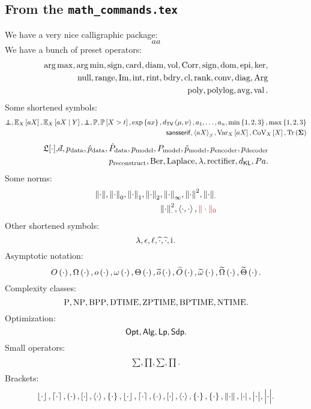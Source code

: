 \subsection{From the \texttt{math\_commands.tex}}
We have a very nice calligraphic package:
\begin{equation}
    aa
\end{equation}
We have a bunch of preset operators:
\begin{align}
    \operatorname*{arg\,max}, \operatorname*{arg\,min}, \operatorname{sign}, \operatorname{card}, \operatorname{diam}, \operatorname{vol}, \operatorname{Corr}, \operatorname{sign}, \operatorname{dom}, \operatorname{epi}, \operatorname{ker},
    \\
    \operatorname{null}, \operatorname{range}, \operatorname{Im}, \operatorname{int}, \operatorname{rint}, \operatorname{bdry}, \operatorname{cl}, \operatorname{rank}, \operatorname{conv}, \operatorname{diag}, \operatorname{Arg}
    \\
    \operatorname{\mathrm{poly}}, \operatorname{\mathrm{polylog}}, \operatorname{\mathop{\mathrm{avg}}}, \operatorname{{\mathrm{val}}}. 
\end{align}
Some shortened symbols:
 \begin{align}
     \independent, \Exp{X}{aX},\ExpCond{X}{aX}{Y}, \indep, \Prob, \Proba{X> t}, \expon{ax}, \dTV{\mu}{\nu}, \abc{a}{n}, \minim{1, 2, 3}, \maxim{1, 2, 3}
     \\
     \msf{sans serif}, \boltz{aX}{\beta}, \Var{X}{aX}, \CoV{X}{X}, \Tr{\mSigma}
 \end{align}
 \begin{align}
  \LFtr{\cdot}, \dbar, \pdata, \ptrain, \Ptrain, \pmodel, \Pmodel, \ptildemodel, \pencode, \pdecode
  \\
  \precons, \bernoulli, \laplace, \reg, \rect, \KL, \parents. %
 \end{align}
 Some norms:
 \begin{align}
    {\left\| \cdot \right\|}, {\left\| \cdot \right\|_0}, {\left\| \cdot \right\|_1}, {\left\| \cdot \right\|_2}, {\left\| \cdot \right\|_{\infty}}, {\left\| \cdot \right\|^2}, {\left\| \cdot \right\|_{\cdot}}
\\
{\left\| \cdot \right\|^2_{\cdot}}, \left\langle\cdot,\cdot\right\rangle, {\color{red}\|\cdot\|_0}
\end{align}
 Other shortened symbols:
 \begin{equation}
    {\lambda}, {\epsilon}, \ell, \widehat{\cdot}, \widetilde{\cdot}, \mathrm{i}\mkern1mu. 
 \end{equation}
 Asymptotic notation:
 \begin{equation}
    O\left(\cdot\right), \Omega\left(\cdot\right), o\left(\cdot\right), \omega\left(\cdot\right), \Theta\left(\cdot\right), \widetilde{o}\left(\cdot\right), \widetilde{O}\left(\cdot\right), \widetilde{\omega}\left(\cdot\right), \widetilde{\Omega}\left(\cdot\right), \widetilde{\Theta}\left(\cdot\right). 
 \end{equation}
 Complexity classes:
 \begin{equation}
    \mathrm{P}, \mathrm{NP}, \mathrm{BPP}, \mathrm{DTIME}, \mathrm{ZPTIME}, \mathrm{BPTIME}, \mathrm{NTIME}. 
 \end{equation}
 Optimization:
 \begin{equation}
    {\mathsf{Opt}}, {\mathsf{Alg}}, {\mathsf{Lp}}, {\mathsf{Sdp}}. 
 \end{equation}
 Small operators:
 \begin{equation}
    {\textstyle \sum}, {\textstyle \prod}, \mathop{{\textstyle \sum}}, \mathop{{\textstyle \prod}}. 
 \end{equation}
 Brackets:
 \begin{equation}
    \left \lfloor\cdot\right\rfloor, \left\lceil\cdot\right\rceil, \left(\cdot\right), \left[\cdot\right], \left\langle\cdot\right\rangle, \left\{\cdot\right\}, \left \lfloor\cdot\right\rfloor, \left\lceil\cdot\right\rceil, \left(\cdot\right), \left[\cdot\right], \left\langle\cdot\right\rangle, \left\{\cdot\right\}, \left\{\cdot\right\}, \left\|\cdot\right\|, \left\lvert \cdot\right\rvert, \bigl\lvert \cdot\bigl\rvert, \Bigl\lvert \cdot\Bigl\rvert. 
 \end{equation}
